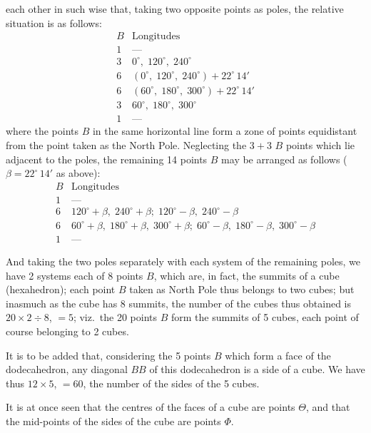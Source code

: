 \documentclass[11pt,a4paper]{article}
\begin{document}
\noindent each other in such wise that, taking two opposite points as poles, the relative situation is as follows:
\[
\begin{array}{c|l}
B & \text{Longitudes}\\
\hline
1 & \text{---}\\
3 & 0^{\circ},\; 120^{\circ},\; 240^{\circ}\\
6 & (0^{\circ},\; 120^{\circ},\; 240^{\circ}) + 22^{\circ}\,14'\\
6 & (60^{\circ},\; 180^{\circ},\; 300^{\circ}) + 22^{\circ}\,14'\\
3 & 60^{\circ},\; 180^{\circ},\; 300^{\circ}\\
1 & \text{---}
\end{array}
\]
where the points $B$ in the same horizontal line form a zone of points equidistant from the point taken as the North Pole. Neglecting the $3 + 3$ $B$ points which lie adjacent to the poles, the remaining 14 points $B$ may be arranged as follows ($\beta = 22^{\circ}\,14'$ as above):
\[
\begin{array}{c|l}
B & \text{Longitudes}\\
\hline
1 & \text{---}\\
6 & 120^{\circ} + \beta,\; 240^{\circ} + \beta;\; 120^{\circ} - \beta,\; 240^{\circ} - \beta\\
6 & 60^{\circ} + \beta,\; 180^{\circ} + \beta,\; 300^{\circ} + \beta;\; 60^{\circ} - \beta,\; 180^{\circ} - \beta,\; 300^{\circ} - \beta\\
1 & \text{---}
\end{array}
\]

And taking the two poles separately with each system of the remaining poles, we have 2 systems each of 8 points $B$, which are, in fact, the summits of a cube (hexahedron); each point $B$ taken as North Pole thus belongs to two cubes; but inasmuch as the cube has 8 summits, the number of the cubes thus obtained is $20 \times 2 \div 8$, $= 5$; viz.\ the 20 points $B$ form the summits of 5 cubes, each point of course belonging to 2 cubes.

\medskip

It is to be added that, considering the 5 points $B$ which form a face of the dodecahedron, any diagonal $BB$ of this dodecahedron is a side of a cube. We have thus $12 \times 5$, $= 60$, the number of the sides of the 5 cubes.

\medskip

It is at once seen that the centres of the faces of a cube are points $\Theta$, and that the mid-points of the sides of the cube are points $\Phi$.
\end{document}

